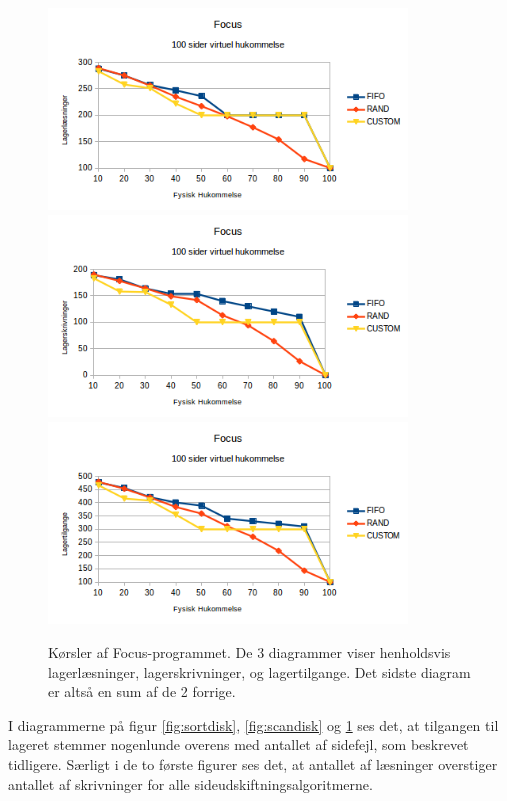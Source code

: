 \begin{figure}[H]
	\centering
	\includegraphics[width=0.85\textwidth]{figures/FocusReads.png}	\includegraphics[width=0.85\textwidth]{figures/FocusWrites.png}	\includegraphics[width=0.85\textwidth]{figures/FocusAccess.png}
	\caption{Kørsler af Focus-programmet. De 3 diagrammer viser henholdsvis lagerlæsninger, lagerskrivninger, og lagertilgange. Det sidste diagram er altså en sum af de 2 forrige.}
	\label{fig:focusdisk}
\end{figure}

I diagrammerne på figur \ref{fig:sortdisk}, \ref{fig:scandisk} og \ref{fig:focusdisk} ses det, at tilgangen til lageret stemmer nogenlunde overens med antallet af sidefejl, som beskrevet tidligere. Særligt i de to første figurer ses det, at antallet af læsninger overstiger antallet af skrivninger for alle sideudskiftningsalgoritmerne.